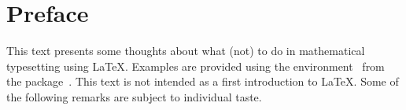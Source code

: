
\chapter{Preface}

This text presents some thoughts about what (not) to do in mathematical typesetting using {\LaTeX}.
Examples are provided using the environment~ from the package~.
This text is not intended as a first introduction to {\LaTeX}.
Some of the following remarks are subject to individual taste.
